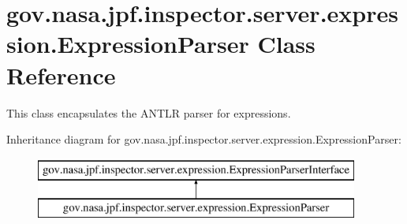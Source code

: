 \hypertarget{classgov_1_1nasa_1_1jpf_1_1inspector_1_1server_1_1expression_1_1_expression_parser}{}\section{gov.\+nasa.\+jpf.\+inspector.\+server.\+expression.\+Expression\+Parser Class Reference}
\label{classgov_1_1nasa_1_1jpf_1_1inspector_1_1server_1_1expression_1_1_expression_parser}


This class encapsulates the A\+N\+T\+LR parser for expressions.  


Inheritance diagram for gov.\+nasa.\+jpf.\+inspector.\+server.\+expression.\+Expression\+Parser\+:\begin{figure}[H]
\begin{center}
\leavevmode
\includegraphics[height=2.000000cm]{classgov_1_1nasa_1_1jpf_1_1inspector_1_1server_1_1expression_1_1_expression_parser}
\end{center}
\end{figure}
